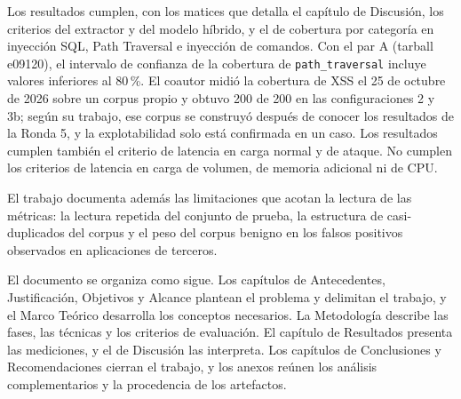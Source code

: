 Los resultados cumplen, con los matices que detalla el capítulo de Discusión, los criterios del extractor y del modelo híbrido, y el de cobertura por categoría en inyección SQL, Path Traversal e inyección de comandos. Con el par A (tarball e09120\textellipsis{}), el intervalo de confianza de la cobertura de \texttt{path\_traversal} incluye valores inferiores al 80\,\%. El coautor midió la cobertura de XSS el 25 de octubre de 2026 sobre un corpus propio y obtuvo 200 de 200 en las configuraciones 2 y 3b; según su trabajo, ese corpus se construyó después de conocer los resultados de la Ronda 5, y la explotabilidad solo está confirmada en un caso. Los resultados cumplen también el criterio de latencia en carga normal y de ataque. No cumplen los criterios de latencia en carga de volumen, de memoria adicional ni de CPU.

El trabajo documenta además las limitaciones que acotan la lectura de las métricas: la lectura repetida del conjunto de prueba, la estructura de casi-duplicados del corpus y el peso del corpus benigno en los falsos positivos observados en aplicaciones de terceros.

El documento se organiza como sigue. Los capítulos de Antecedentes, Justificación, Objetivos y Alcance plantean el problema y delimitan el trabajo, y el Marco Teórico desarrolla los conceptos necesarios. La Metodología describe las fases, las técnicas y los criterios de evaluación. El capítulo de Resultados presenta las mediciones, y el de Discusión las interpreta. Los capítulos de Conclusiones y Recomendaciones cierran el trabajo, y los anexos reúnen los análisis complementarios y la procedencia de los artefactos.
